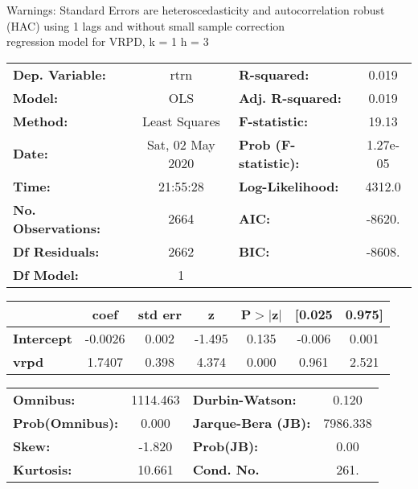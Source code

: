 Warnings: \newline
 [1] Standard Errors are heteroscedasticity and autocorrelation robust (HAC) using 1 lags and without small sample correction\\ 

regression model for VRPD, k = 1 h = 3\begin{center}
\begin{tabular}{lclc}
\toprule
\textbf{Dep. Variable:}    &       rtrn       & \textbf{  R-squared:         } &     0.019   \\
\textbf{Model:}            &       OLS        & \textbf{  Adj. R-squared:    } &     0.019   \\
\textbf{Method:}           &  Least Squares   & \textbf{  F-statistic:       } &     19.13   \\
\textbf{Date:}             & Sat, 02 May 2020 & \textbf{  Prob (F-statistic):} &  1.27e-05   \\
\textbf{Time:}             &     21:55:28     & \textbf{  Log-Likelihood:    } &    4312.0   \\
\textbf{No. Observations:} &        2664      & \textbf{  AIC:               } &    -8620.   \\
\textbf{Df Residuals:}     &        2662      & \textbf{  BIC:               } &    -8608.   \\
\textbf{Df Model:}         &           1      & \textbf{                     } &             \\
\bottomrule
\end{tabular}
\begin{tabular}{lcccccc}
                   & \textbf{coef} & \textbf{std err} & \textbf{z} & \textbf{P$> |$z$|$} & \textbf{[0.025} & \textbf{0.975]}  \\
\midrule
\textbf{Intercept} &      -0.0026  &        0.002     &    -1.495  &         0.135        &       -0.006    &        0.001     \\
\textbf{vrpd}      &       1.7407  &        0.398     &     4.374  &         0.000        &        0.961    &        2.521     \\
\bottomrule
\end{tabular}
\begin{tabular}{lclc}
\textbf{Omnibus:}       & 1114.463 & \textbf{  Durbin-Watson:     } &    0.120  \\
\textbf{Prob(Omnibus):} &   0.000  & \textbf{  Jarque-Bera (JB):  } & 7986.338  \\
\textbf{Skew:}          &  -1.820  & \textbf{  Prob(JB):          } &     0.00  \\
\textbf{Kurtosis:}      &  10.661  & \textbf{  Cond. No.          } &     261.  \\
\bottomrule
\end{tabular}
\end{center}

